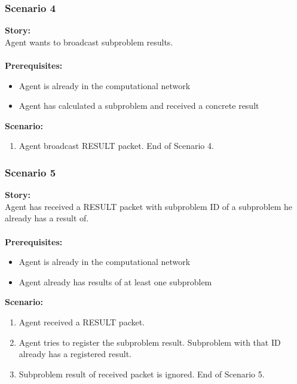 \documentclass{article}
\begin{document}
\subsubsection{Scenario 4}
\noindent\textbf{Story:} \\
Agent wants to broadcast subproblem results. \\\\
\textbf{Prerequisites:}
\begin{itemize}
    \item Agent is already in the computational network
    \item Agent has calculated a subproblem and received a concrete result
\end{itemize}
\textbf{Scenario:}
\begin{enumerate}
    \item Agent broadcast RESULT packet. End of Scenario 4.
\end{enumerate}

\subsubsection{Scenario 5}
\noindent\textbf{Story:} \\
Agent has received a RESULT packet with subproblem ID of a subproblem he already has a result of. \\\\
\textbf{Prerequisites:}
\begin{itemize}
    \item Agent is already in the computational network
    \item Agent already has results of at least one subproblem
\end{itemize}
\textbf{Scenario:}
\begin{enumerate}
    \item Agent received a RESULT packet.
    \item Agent tries to register the subproblem result. Subproblem with that ID already has a registered result.
    \item Subproblem result of received packet is ignored. End of Scenario 5.
\end{enumerate}
\end{document}
